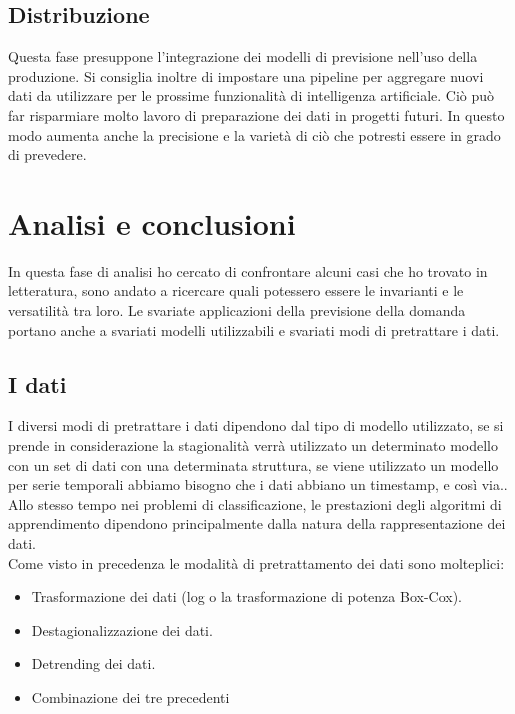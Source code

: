 \documentclass[12pt,a4paper]{report}
\begin{document}
\subsection{Distribuzione}
Questa fase presuppone l'integrazione dei modelli di previsione nell'uso della produzione. Si consiglia inoltre di impostare una pipeline per aggregare nuovi dati da utilizzare per le prossime funzionalità di intelligenza artificiale. Ciò può far risparmiare molto lavoro di preparazione dei dati in progetti futuri. In questo modo aumenta anche la precisione e la varietà di ciò che potresti essere in grado di prevedere.


\section{Analisi e conclusioni}
In questa fase di analisi ho cercato di confrontare alcuni casi che ho trovato in letteratura, sono andato a ricercare quali potessero essere le invarianti e le versatilità tra loro.
Le svariate applicazioni della previsione della domanda portano anche a svariati modelli utilizzabili e svariati modi di pretrattare i dati.\\

\subsection{I dati}
I diversi modi di pretrattare i dati dipendono dal tipo di modello utilizzato, se si prende in considerazione la stagionalità verrà utilizzato un determinato modello con un set di dati con una determinata struttura,
se viene utilizzato un modello per serie temporali abbiamo bisogno che i dati abbiano un timestamp, e così via..\\
Allo stesso tempo nei problemi di classificazione, le prestazioni degli algoritmi di apprendimento dipendono principalmente dalla natura della rappresentazione dei dati.\\

Come visto in precedenza le modalità di pretrattamento dei dati sono molteplici:
\begin{itemize}
    \item Trasformazione dei dati (log o la trasformazione di potenza Box-Cox).
    \item Destagionalizzazione dei dati.
    \item Detrending dei dati.
    \item Combinazione dei tre precedenti
\end{itemize}
\end{document}
